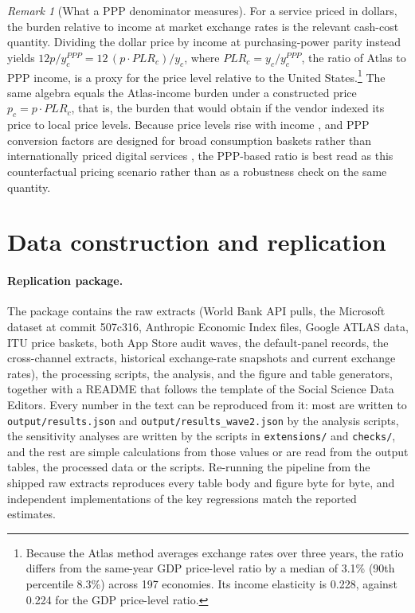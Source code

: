 \documentclass[11pt]{article}
\theoremstyle{definition}
\theoremstyle{remark}
\newtheorem{remark}{Remark}
\begin{document}
\begin{remark}[What a PPP denominator measures]\label{rem:ppp}
For a service priced in dollars, the burden relative to income at market exchange rates is the relevant cash-cost quantity. Dividing the dollar price by income at purchasing-power parity instead yields $12p/y^{PPP}_c = 12\,(p\cdot PLR_c)/y_c$, where $PLR_c = y_c/y^{PPP}_c$, the ratio of Atlas to PPP income, is a proxy for the price level relative to the United States.\footnote{Because the Atlas method averages exchange rates over three years, the ratio differs from the same-year GDP price-level ratio by a median of 3.1\% (90th percentile 8.3\%) across 197 economies. Its income elasticity is 0.228, against 0.224 for the GDP price-level ratio.} The same algebra equals the Atlas-income burden under a constructed price $p_c=p\cdot PLR_c$, that is, the burden that would obtain if the vendor indexed its price to local price levels. Because price levels rise with income \citep{balassa1964purchasing,samuelson1964theoretical}, and PPP conversion factors are designed for broad consumption baskets rather than internationally priced digital services \citep{deaton2010understanding}, the PPP-based ratio is best read as this counterfactual pricing scenario rather than as a robustness check on the same quantity.
\end{remark}

\clearpage
\section{Data construction and replication}\label{app:data}

\paragraph{Replication package.} The package contains the raw extracts (World Bank API pulls, the Microsoft dataset at commit 507c316, Anthropic Economic Index files, Google ATLAS data, ITU price baskets, both App Store audit waves, the default-panel records, the cross-channel extracts, historical exchange-rate snapshots and current exchange rates), the processing scripts, the analysis, and the figure and table generators, together with a README that follows the template of the Social Science Data Editors. Every number in the text can be reproduced from it: most are written to \nolinkurl{output/results.json} and \nolinkurl{output/results_wave2.json} by the analysis scripts, the sensitivity analyses are written by the scripts in \nolinkurl{extensions/} and \nolinkurl{checks/}, and the rest are simple calculations from those values or are read from the output tables, the processed data or the scripts. Re-running the pipeline from the shipped raw extracts reproduces every table body and figure byte for byte, and independent implementations of the key regressions match the reported estimates.
\end{document}
